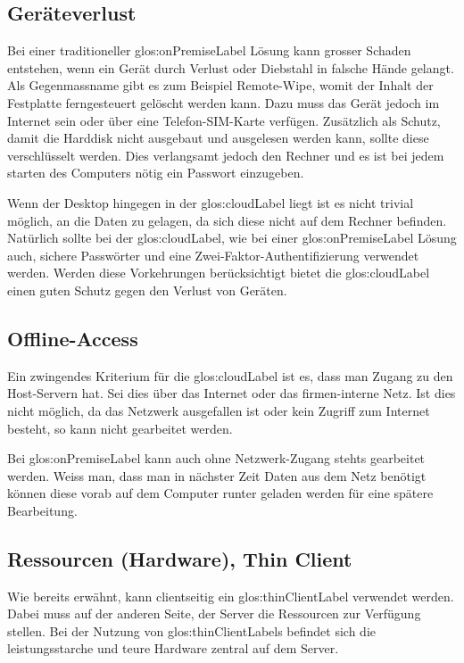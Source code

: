 \subsection{Geräteverlust}
Bei einer traditioneller \gls{glos:onPremiseLabel} Lösung kann grosser Schaden entstehen, wenn ein Gerät durch Verlust oder Diebstahl in falsche Hände gelangt.
Als Gegenmassname gibt es zum Beispiel Remote-Wipe, womit der Inhalt der Festplatte ferngesteuert gelöscht werden kann. Dazu muss das Gerät jedoch im Internet sein oder über eine Telefon-SIM-Karte verfügen.
Zusätzlich als Schutz, damit die Harddisk nicht ausgebaut und ausgelesen werden kann, sollte diese verschlüsselt werden. Dies verlangsamt jedoch den Rechner und es ist bei jedem starten des Computers nötig ein Passwort einzugeben.

Wenn der Desktop hingegen in der \Gls{glos:cloudLabel} liegt ist es nicht trivial möglich, an die Daten zu gelagen, da sich diese nicht auf dem Rechner befinden.
Natürlich sollte bei der \Gls{glos:cloudLabel}, wie bei einer \gls{glos:onPremiseLabel} Lösung auch, sichere Passwörter und eine Zwei-Faktor-Authentifizierung verwendet werden. Werden diese Vorkehrungen berücksichtigt bietet die \Gls{glos:cloudLabel} einen guten Schutz gegen den Verlust von Geräten.

\subsection{Offline-Access}
Ein zwingendes Kriterium für die \Gls{glos:cloudLabel} ist es, dass man Zugang zu den Host-Servern hat. Sei dies über das Internet oder das firmen-interne Netz. Ist dies nicht möglich, da das Netzwerk ausgefallen ist oder kein Zugriff zum Internet besteht, so kann nicht gearbeitet werden.

Bei \gls{glos:onPremiseLabel} kann auch ohne Netzwerk-Zugang stehts gearbeitet werden. Weiss man, dass man in nächster Zeit Daten aus dem Netz benötigt können diese vorab auf dem Computer runter geladen werden für eine spätere Bearbeitung.

\subsection{Ressourcen (Hardware), Thin Client}
Wie bereits erwähnt, kann clientseitig ein \gls{glos:thinClientLabel} verwendet werden. Dabei muss auf der anderen Seite, der Server die Ressourcen zur Verfügung stellen.
Bei der Nutzung von \glspl{glos:thinClientLabel} befindet sich die leistungsstarche und teure Hardware zentral auf dem Server.

